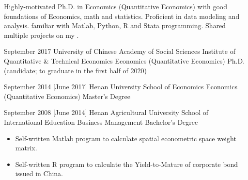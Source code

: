 \documentclass{resume}
\begin{document}
\makeheader

Highly-motivated Ph.D\@. in Economics (Quantitative Economics) with good foundations
of Economics, math and statistics.
Proficient in data modeling and analysis.
familiar with Matlab, Python, R and Stata programming.
Shared multiple projects on my
.


\begin{competences}[10em]
\end{competences}

\begin{educations}
  \education%
    {September 2017}%
    {University of Chinese Academy of Social Sciences}%
    {Institute of Quantitative \& Technical Economics}%
    {Economics (Quantitative Economics)}%
    {Ph.D\@. (candidate; to graduate in the first half of 2020)}

  \separator{0.5em}
  \education%
    {September 2014}%
    [June 2017]%
    {Henan University}%
    {School of Economics}%
    {Economics (Quantitative Economics)}%
    {Master's Degree}

  \separator{0.5em}
  \education%
    {September 2008}%
    [June 2014]%
    {Henan Agricultural University}%
    {School of International Education}%
    {Business Management}%
    {Bachelor's Degree}
\end{educations}



\begin{itemize}
  \item Self-written Matlab program to calculate spatial econometric space weight matrix.
  \item Self-written R program to calculate the Yield-to-Mature of corporate bond issued in China.

\end{itemize}
\end{document}
